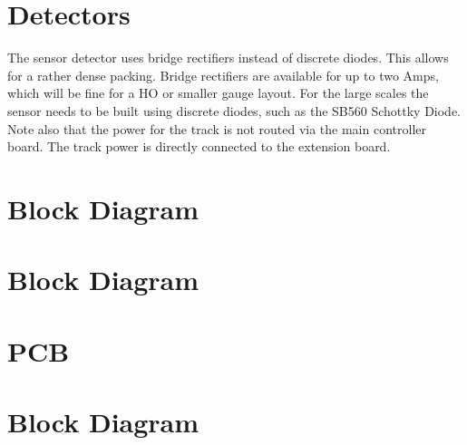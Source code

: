 \section{Detectors}

The sensor detector uses bridge rectifiers instead of discrete diodes. This allows for a rather dense packing. Bridge rectifiers are available for up to two Amps, which will be fine for a HO or smaller gauge layout. For the large scales the sensor needs to be built using discrete diodes, such as the SB560 Schottky Diode. Note also that the power for the track is not routed via the main controller board. The track power is directly connected to the extension board.

\section{Block Diagram}


\section{Block Diagram}


\section{PCB}

\section{Block Diagram}



